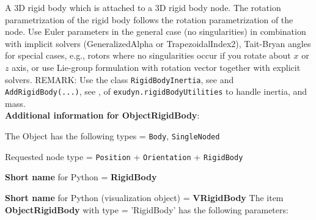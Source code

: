 \label{sec:item:ObjectRigidBody}
A 3D rigid body which is attached to a 3D rigid body node. The rotation parametrization of the rigid body follows the rotation parametrization of the node. Use Euler parameters in the general case (no singularities) in combination with implicit solvers (GeneralizedAlpha or TrapezoidalIndex2), Tait-Bryan angles for special cases, e.g., rotors where no singularities occur if you rotate about $x$ or $z$ axis, or use Lie-group formulation with rotation vector together with explicit solvers. REMARK: Use the class \texttt{RigidBodyInertia}, see  and \texttt{AddRigidBody(...)}, see , of \texttt{exudyn.rigidBodyUtilities} to handle inertia,  and mass. \vspace{12pt}
 \\{\bf Additional information for ObjectRigidBody}:
\bi
  \item The Object has the following types = \texttt{Body}, \texttt{SingleNoded}
  \item Requested node type = \texttt{Position} + \texttt{Orientation} + \texttt{RigidBody}
  \item {\bf Short name} for Python = {\bf RigidBody}  \item {\bf Short name} for Python (visualization object) = {\bf VRigidBody}\ei
\vspace{12pt} \noindent The item {\bf ObjectRigidBody} with type = 'RigidBody' has the following parameters:\vspace{-1cm}\\ 
